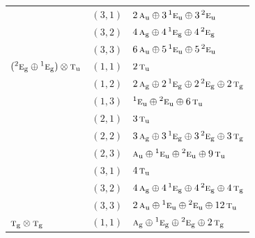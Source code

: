 \documentclass[11pt]{article}
\newcommand{\irr}[1]{\text{\normalfont\scshape #1}}
\newcommand{\conjpair}[1]{{}^{#1}}
\newcommand{\ptag}[1]{\mathrm{#1}}
\begin{document}
\begin{longtable}{p{} c p{}}
 & $(3,1)$ & $2\,\irr{a}_{\ptag{u}}\oplus 3\,\conjpair{1}\irr{e}_{\ptag{u}}\oplus 3\,\conjpair{2}\irr{e}_{\ptag{u}}$\\

 & $(3,2)$ & $4\,\irr{a}_{\ptag{g}}\oplus 4\,\conjpair{1}\irr{e}_{\ptag{g}}\oplus 4\,\conjpair{2}\irr{e}_{\ptag{g}}$\\

 & $(3,3)$ & $6\,\irr{a}_{\ptag{u}}\oplus 5\,\conjpair{1}\irr{e}_{\ptag{u}}\oplus 5\,\conjpair{2}\irr{e}_{\ptag{u}}$\\

\hline

$(\conjpair{2}\irr{e}_{\ptag{g}}\oplus \conjpair{1}\irr{e}_{\ptag{g}})\otimes \irr{t}_{\ptag{u}}$ & $(1,1)$ & $2\,\irr{t}_{\ptag{u}}$\\

 & $(1,2)$ & $2\,\irr{a}_{\ptag{g}}\oplus 2\,\conjpair{1}\irr{e}_{\ptag{g}}\oplus 2\,\conjpair{2}\irr{e}_{\ptag{g}}\oplus 2\,\irr{t}_{\ptag{g}}$\\

 & $(1,3)$ & $\conjpair{1}\irr{e}_{\ptag{u}}\oplus \conjpair{2}\irr{e}_{\ptag{u}}\oplus 6\,\irr{t}_{\ptag{u}}$\\

 & $(2,1)$ & $3\,\irr{t}_{\ptag{u}}$\\

 & $(2,2)$ & $3\,\irr{a}_{\ptag{g}}\oplus 3\,\conjpair{1}\irr{e}_{\ptag{g}}\oplus 3\,\conjpair{2}\irr{e}_{\ptag{g}}\oplus 3\,\irr{t}_{\ptag{g}}$\\

 & $(2,3)$ & $\irr{a}_{\ptag{u}}\oplus \conjpair{1}\irr{e}_{\ptag{u}}\oplus \conjpair{2}\irr{e}_{\ptag{u}}\oplus 9\,\irr{t}_{\ptag{u}}$\\

 & $(3,1)$ & $4\,\irr{t}_{\ptag{u}}$\\

 & $(3,2)$ & $4\,\irr{a}_{\ptag{g}}\oplus 4\,\conjpair{1}\irr{e}_{\ptag{g}}\oplus 4\,\conjpair{2}\irr{e}_{\ptag{g}}\oplus 4\,\irr{t}_{\ptag{g}}$\\

 & $(3,3)$ & $2\,\irr{a}_{\ptag{u}}\oplus \conjpair{1}\irr{e}_{\ptag{u}}\oplus \conjpair{2}\irr{e}_{\ptag{u}}\oplus 12\,\irr{t}_{\ptag{u}}$\\

\hline

$\irr{t}_{\ptag{g}}\otimes \irr{t}_{\ptag{g}}$ & $(1,1)$ & $\irr{a}_{\ptag{g}}\oplus \conjpair{1}\irr{e}_{\ptag{g}}\oplus \conjpair{2}\irr{e}_{\ptag{g}}\oplus 2\,\irr{t}_{\ptag{g}}$\\


\end{longtable}
\end{document}
